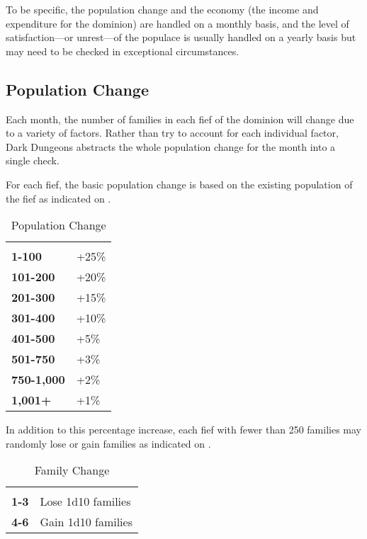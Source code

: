 \begin{multicols*}{2}
To be specific, the population change and the economy (the income and expenditure for the dominion) are handled on a monthly basis, and the level of satisfaction—or unrest—of the populace is usually handled on a yearly basis but may need to be checked in exceptional circumstances.

\subsection{Population Change}
Each month, the number of families in each fief of the dominion will change due to a variety of factors. Rather than try to account for each individual factor, Dark Dungeons abstracts the whole population change for the month into a single check.

For each fief, the basic population change is based on the existing population of the fief as indicated on .

\begin {table}[H]
  \caption{Population Change}\label{tab:Population Change}
  \begin{tabularx}{\columnwidth}{>{\bfseries}YY}
	 & \\
	1-100 & +25\%\\
	101-200 & +20\%\\
	201-300 & +15\%\\
	301-400 & +10\%\\
	401-500 & +5\%\\
	501-750 & +3\%\\
	750-1,000 & +2\%\\
	1,001+ & +1\%
  \end {tabularx}
\end {table}

In addition to this percentage increase, each fief with fewer than 250 families may randomly lose or gain families as indicated on .

\begin {table}[H]
  \caption{Family Change}\label{tab:Family Change}
  \begin{tabularx}{\columnwidth}{>{\bfseries}YY}
	 & \\
	1-3 & Lose 1d10 families\\
	4-6 & Gain 1d10 families\\
  \end {tabularx}
\end {table}


\end{multicols*}
